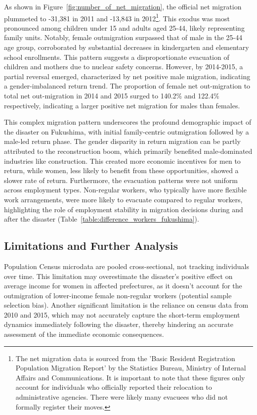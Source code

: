 \documentclass[a4paper,12pt]{article}
\begin{document}
As shown in Figure~\ref{fig:number_of_net_migration}, the official net migration plummeted to -31,381 in 2011 and -13,843 in 2012\footnote{The net migration data is sourced from the 'Basic Resident Registration Population Migration Report' by the Statistics Bureau, Ministry of Internal Affairs and Communications. It is important to note that these figures only account for individuals who officially reported their relocation to administrative agencies. There were likely many evacuees who did not formally register their moves.}. This exodus was most pronounced among children under 15 and adults aged 25-44, likely representing family units. Notably, female outmigration surpassed that of male in the 25-44 age group, corroborated by substantial decreases in kindergarten and elementary school enrollments. This pattern suggests a disproportionate evacuation of children and mothers due to nuclear safety concerns. However, by 2014-2015, a partial reversal emerged, characterized by net positive male migration, indicating a gender-imbalanced return trend. The proportion of female net out-migration to total net out-migration in 2014 and 2015 surged to 140.2\% and 122.4\% respectively, indicating a larger positive net migration for males than females. 


This complex migration pattern underscores the profound demographic impact of the disaster on Fukushima, with initial family-centric outmigration followed by a male-led return phase. The gender disparity in return migration can be partly attributed to the reconstruction boom, which primarily benefited male-dominated industries like construction. This created more economic incentives for men to return, while women, less likely to benefit from these opportunities, showed a slower rate of return. Furthermore, the evacuation patterns were not uniform across employment types. Non-regular workers, who typically have more flexible work arrangements, were more likely to evacuate compared to regular workers, highlighting the role of employment stability in migration decisions during and after the disaster (Table~\ref{table:difference_workers_fukushima}).



\subsection{Limitations and Further Analysis}


Population Census microdata are pooled cross-sectional, not tracking individuals over time. This limitation may overestimate the disaster's positive effect on average income for women in affected prefectures, as it doesn't account for the outmigration of lower-income female non-regular workers (potential sample selection bias). Another significant limitation is the reliance on census data from 2010 and 2015, which may not accurately capture the short-term employment dynamics immediately following the disaster, thereby hindering an accurate assessment of the immediate economic consequences.
\end{document}
